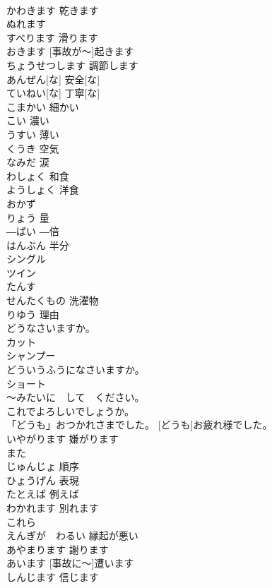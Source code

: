 \documentclass[8pt]{extreport}
\begin{document}
\begin{CJK}{UTF8}{min}
\\	かわきます	乾きます	
\\	ぬれます			
\\	すべります	滑ります	
\\	[じこが～]おきます	[事故が～]起きます	
\\	ちょうせつします	調節します	
\\	あんぜん[な]	安全[な]	
\\	ていねい[な]	丁寧[な]	
\\	こまかい	細かい	
\\	こい	濃い	
\\	うすい	薄い	
\\	くうき	空気	
\\	なみだ	涙	
\\	わしょく	和食	
\\	ようしょく	洋食	
\\	おかず			
\\	りょう	量	
\\	―ばい	―倍	
\\	はんぶん	半分	
\\	シングル			
\\	ツイン			
\\	たんす			
\\	せんたくもの	洗濯物	
\\	りゆう	理由	
\\	どうなさいますか。			
\\	カット			
\\	シャンプー			
\\	どういうふうになさいますか。			
\\	ショート			
\\	～みたいに　して　ください。			
\\	これでよろしいでしょうか。			
\\	「どうも」おつかれさまでした。	[どうも]お疲れ様でした。	
\\	いやがります	嫌がります	
\\	また			
\\	じゅんじょ	順序	
\\	ひょうげん	表現	
\\	たとえば	例えば	
\\	わかれます	別れます	
\\	これら			
\\	えんぎが　わるい	縁起が悪い	
\\	あやまります	謝ります	
\\	[じこに～] あいます	[事故に～]遭います	
\\	しんじます	信じます	

\end{CJK}
\end{document}

